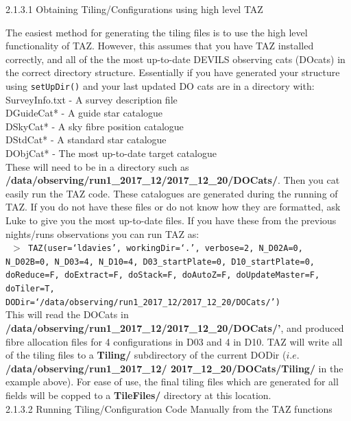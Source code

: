 \documentclass[12pt]{article}
\begin{document}
\textsf{2.1.3.1 Obtaining Tiling/Configurations using high level TAZ}

The easiest method for generating the tiling files is to use the high level functionality of TAZ. However, this assumes that you have TAZ installed correctly, and all of the the most up-to-date DEVILS observing cats (DOcats) in the correct directory structure. Essentially if you have generated your structure using \texttt{setUpDir()} and your last updated DO cats are in a directory with: \\

SurveyInfo.txt - A survey description file \\
DGuideCat* - A guide star catalogue \\
DSkyCat* - A sky fibre position catalogue \\
DStdCat* - A standard star catalogue \\
DObjCat* - The most up-to-date target catalogue \\

These will need to be in a directory such as \textbf{/data/observing/run1\_2017\_12/2017\_12\_20/DOCats/}. Then you cat easily run the TAZ code. These catalogues are generated during the running of TAZ. If you do not have these files or do not know how they are formatted, ask Luke to give you the most up-to-date files. If you have these from the previous nights/runs observations you can run TAZ as: \\

\texttt{ $>$ TAZ(user=`ldavies', workingDir=`.', verbose=2, N\_D02A=0, N\_D02B=0, N\_D03=4, N\_D10=4, D03\_startPlate=0, D10\_startPlate=0, doReduce=F, doExtract=F, 
doStack=F, doAutoZ=F, doUpdateMaster=F, doTiler=T, \\
DODir=`/data/observing/run1\_2017\_12/2017\_12\_20/DOCats/')} \\

This will read the DOCats in \textbf{/data/observing/run1\_2017\_12/2017\_12\_20/DOCats/'}, and produced fibre allocation files for 4 configurations in D03 and 4 in D10. TAZ will write all of the tiling files to a \textbf{Tiling/} subdirectory of the current DODir ($i.e.$ \textbf{/data/observing/run1\_2017\_12/ 2017\_12\_20/DOCats/Tiling/} in the example above). For ease of use, the final tiling files which are generated for all fields will be copped to a  \textbf{TileFiles/} directory at this location. \\

\textsf{2.1.3.2 Running Tiling/Configuration Code Manually from the TAZ functions}
\end{document}
